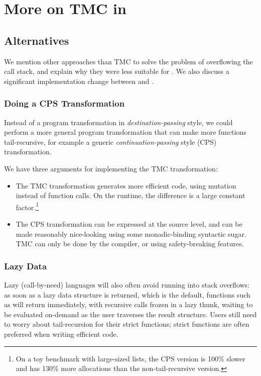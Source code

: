 \section{More on TMC in \OCaml}
\label{app:more-ocaml}

\subsection{Alternatives}
\label{subsec:alternative-impls}

We mention other approaches than TMC to solve the problem of overflowing the call stack, and explain why they were less suitable for \OCaml. We also discuss a significant implementation change between  and .

\subsubsection{Doing a CPS Transformation}

Instead of a program transformation in \emph{destination-passing} style, we could perform a more general program transformation that can make more functions tail-recursive, for example a generic \emph{continuation-passing} style (CPS) transformation.

We have three arguments for implementing the TMC transformation:
\begin{itemize}
\item The TMC transformation generates more efficient code, using mutation instead of function calls. On the \OCaml runtime, the difference is a large constant factor.\footnote{On a toy benchmark with large-sized lists, the CPS version is 100\% slower and has 130\% more allocations than the non-tail-recursive version.}

\item The CPS transformation can be expressed at the source level, and can be made reasonably nice-looking using some monadic-binding syntactic sugar. TMC can only be done by the compiler, or using safety-breaking features.
\end{itemize}

\subsubsection{Lazy Data}

Lazy (call-by-need) languages will also often avoid running into stack overflows: as soon as a lazy data structure is returned, which is the default, functions such as  will return immediately, with recursive calls frozen in a lazy thunk, waiting to be evaluated on-demand as the user traverses the result structure.
Users still need to worry about tail-recursion for their strict functions; strict functions are often preferred when writing efficient code.

